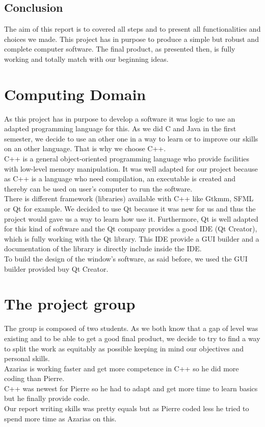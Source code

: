 \section{Conclusion}
The aim of this report is to covered all steps and to present all functionalities and choices we made. This project has in purpose to produce a simple but robust and complete computer software. The final product, as presented then, is fully working and totally match with our beginning ideas.  

\chapter{Computing Domain}
As this project has in purpose to develop a software it was logic to use an adapted programming language for this. As we did C and Java in the first semester, we decide to use an other one in a way to learn or to improve our skills on an other language. That is why we choose C++.
\\
C++ is a general object-oriented programming language who provide facilities with low-level memory manipulation. It was well adapted for our project because as C++ is a language who need compilation, an executable is created and thereby can be used on user's computer to run the software. 
\\
There is different framework (libraries) available with C++ like Gtkmm, SFML or Qt for example. We decided to use Qt because it was new for us and thus the project would gave us a way to learn how use it. Furthermore, Qt is well adapted for this kind of software and the Qt company provides a good IDE (Qt Creator), which is fully working with the Qt library. This IDE provide a GUI builder and a documentation of the library is directly include inside the IDE. 
\\
To build the design of the window's software, as said before, we used the GUI builder provided buy Qt Creator.

\chapter{The project group}
The group is composed of two students. As we both know that a gap of level was existing and to be able to get a good final product, we decide to try to find a way to split the work as equitably as possible keeping in mind our objectives and personal skills.
\\
Azarias is working faster and get more competence in C++ so he did more coding than Pierre. 
\\
C++ was newest for Pierre so he had to adapt and get more time to learn basics but he finally provide code. 
\\
Our report writing skills was pretty equals but as Pierre coded less he tried to spend more time as Azarias on this. 

